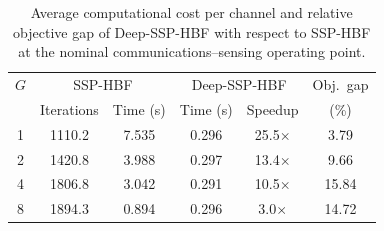 \begin{table}[t]
\centering
\caption{Average computational cost per channel and relative objective gap of Deep-SSP-HBF with respect to SSP-HBF at the nominal communications--sensing operating point.}
\label{tab:runtime}
\begin{tabular}{c|cc|cc|c}
\hline
$G$ & \multicolumn{2}{c|}{SSP-HBF} & \multicolumn{2}{c|}{Deep-SSP-HBF} & Obj.\ gap \\
 & Iterations & Time (s) & Time (s) & Speedup & (\%) \\
\hline
1 & 1110.2 & 7.535 & 0.296 & 25.5$\times$ & 3.79 \\
2 & 1420.8 & 3.988 & 0.297 & 13.4$\times$ & 9.66 \\
4 & 1806.8 & 3.042 & 0.291 & 10.5$\times$ & 15.84 \\
8 & 1894.3 & 0.894 & 0.296 & 3.0$\times$ & 14.72 \\
\hline
\end{tabular}
\end{table}
